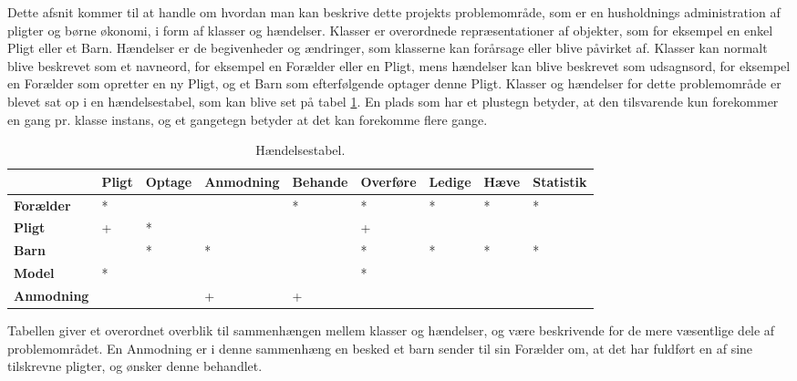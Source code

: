 Dette afsnit kommer til at handle om hvordan man kan beskrive dette projekts problemområde, som er en husholdnings administration af pligter og børne økonomi, i form af klasser og hændelser. Klasser er overordnede repræsentationer af objekter, som for eksempel en enkel Pligt eller et Barn. Hændelser er de begivenheder og ændringer, som klasserne kan forårsage eller blive påvirket af. Klasser kan normalt blive beskrevet som et navneord, for eksempel en Forælder eller en Pligt, mens hændelser kan blive beskrevet som udsagnsord, for eksempel en Forælder som opretter en ny Pligt, og et Barn som efterfølgende optager denne Pligt. Klasser og hændelser for dette problemområde er blevet sat op i en hændelsestabel, som kan blive set på tabel \ref{Haendelstabel}. En plads som har et plustegn betyder, at den tilsvarende kun forekommer en gang pr. klasse instans, og et gangetegn betyder at det kan forekomme flere gange.

\begin{table}[H]
	\centering
	\begin{tabular}{| >{\centering\arraybackslash}m{1in} | >{\centering\arraybackslash}m{1in} | >{\centering\arraybackslash}m{1in} | >{\centering\arraybackslash}m{1in} | >{\centering\arraybackslash}m{1in} | >{\centering\arraybackslash}m{1in} | >{\centering\arraybackslash}m{1in} | >{\centering\arraybackslash}m{1in} | >{\centering\arraybackslash}m{1in} |}
	\hline
	& \textbf{Pligt} & \textbf{Optage} & 
	\textbf{Anmodning} & \textbf{Behande} & 
	\textbf{Overføre} & \textbf{Ledige} & 
	\textbf{Hæve} & \textbf{Statistik} \\ \hline
	\textbf{Forælder} & * &  &  & * & * & * & * & * \\ \hline
	\textbf{Pligt} & + & * &  &  & + &  &  &  \\ \hline
	\textbf{Barn} &   & * & * &  & * & * & * & * \\ \hline
	\textbf{Model} & * &  &  &  & * &  &  &  \\ \hline
	\textbf{Anmodning} &  &  & + & + &  &  &  &  \\ \hline
	\end{tabular}
	\caption{Hændelsestabel.}
	\label{Haendelstabel}
\end{table}

Tabellen giver et overordnet overblik til sammenhængen mellem klasser og hændelser, og være beskrivende for de mere væsentlige dele af problemområdet. En Anmodning er i denne sammenhæng en besked et barn sender til sin Forælder om, at det har fuldført en af sine tilskrevne pligter, og ønsker denne behandlet.

